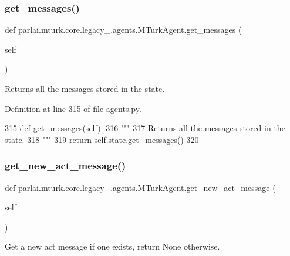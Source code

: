 \subsubsection{\texorpdfstring{get\+\_\+messages()}{get\_messages()}}
{\footnotesize\ttfamily def parlai.\+mturk.\+core.\+legacy\+\_.\+agents.\+M\+Turk\+Agent.\+get\+\_\+messages (\begin{DoxyParamCaption}\item[{}]{self }\end{DoxyParamCaption})}

\begin{DoxyVerb}Returns all the messages stored in the state.
\end{DoxyVerb}
 

Definition at line 315 of file agents.\+py.


\begin{DoxyCode}
315     \textcolor{keyword}{def }get\_messages(self):
316         \textcolor{stringliteral}{"""}
317 \textcolor{stringliteral}{        Returns all the messages stored in the state.}
318 \textcolor{stringliteral}{        """}
319         \textcolor{keywordflow}{return} self.state.get\_messages()
320 
\end{DoxyCode}
\mbox{\label{classparlai_1_1mturk_1_1core_1_1legacy__2018_1_1agents_1_1MTurkAgent_a4a4600fbaef5ddae36ae3d74542b35fe}} 
\subsubsection{\texorpdfstring{get\+\_\+new\+\_\+act\+\_\+message()}{get\_new\_act\_message()}}
{\footnotesize\ttfamily def parlai.\+mturk.\+core.\+legacy\+\_.\+agents.\+M\+Turk\+Agent.\+get\+\_\+new\+\_\+act\+\_\+message (\begin{DoxyParamCaption}\item[{}]{self }\end{DoxyParamCaption})}

\begin{DoxyVerb}Get a new act message if one exists, return None otherwise.
\end{DoxyVerb}
 

